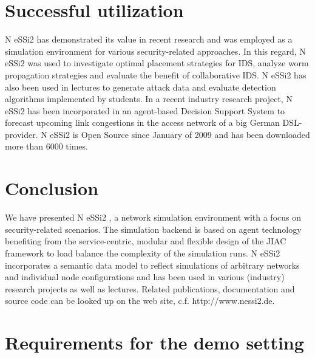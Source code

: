 \documentclass[sigconf]{aamas}
\begin{document}

\section{Successful utilization}

N eSSi2 has demonstrated its value in recent research and was employed as a simulation environment for various security-related approaches. In this regard, N eSSi2 was used to investigate optimal placement strategies for IDS, analyze worm propagation strategies and evaluate the benefit of collaborative IDS. N eSSi2 has also been used in lectures to generate attack data and evaluate detection algorithms implemented by students. In a recent industry research project, N eSSi2 has been incorporated in an agent-based Decision Support System to forecast upcoming link congestions in the access network of a big German DSL-provider.
N eSSi2 is Open Source since January of 2009 and has been
downloaded more than 6000 times.


\section{Conclusion}

We have presented N eSSi2 , a network simulation environment with a focus on security-related scenarios. The simulation backend is based on agent technology benefiting from the service-centric, modular and flexible design of the JIAC framework to load balance the complexity of the simulation runs. N eSSi2 incorporates a semantic data model to reflect simulations of arbitrary networks and individual node configurations and has been used in various (industry) research projects as well as lectures. Related publications, documentation and source code can be looked up on the web site, c.f. http://www.nessi2.de.\nocite{*}




\newpage

 



\newpage
\phantom{ }
\newpage

\section*{Requirements for the demo setting}




\end{document}
